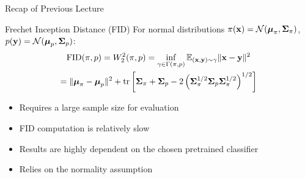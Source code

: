 \documentclass{beamer}
\begin{document}
\begin{frame}
\titlepage
\end{frame}
\begin{frame}{Recap of Previous Lecture}
	\vspace{-0.3cm}
	\begin{block}{Frechet Inception Distance (FID)}
		For normal distributions $\pi(\mathbf{x}) = \mathcal{N}(\boldsymbol{\mu}_\pi, \boldsymbol{\Sigma}_\pi)$, $p(\mathbf{y}) = \mathcal{N}(\boldsymbol{\mu}_p, \boldsymbol{\Sigma}_p)$:
		\vspace{-0.3cm}
		\begin{multline*}
			\mathrm{FID} (\pi, p) =  W_2^2(\pi, p) = \inf_{\gamma \in \Gamma(\pi, p)} \mathbb{E}_{(\mathbf{x}, \mathbf{y}) \sim \gamma} \| \mathbf{x} - \mathbf{y} \|^2 \\
			= \| \boldsymbol{\mu}_{\pi} - \boldsymbol{\mu}_{p}\|^2 + \text{tr} \left[ \boldsymbol{\Sigma}_{\pi} + \boldsymbol{\Sigma}_p - 2 \left(\boldsymbol{\Sigma}_{\pi}^{1/2} \boldsymbol{\Sigma}_p \boldsymbol{\Sigma}_{\pi}^{1/2} \right)^{1/2} \right]
		\end{multline*}
		\vspace{-0.4cm}
	\end{block}
	\begin{itemize}
		\item Requires a large sample size for evaluation
		\item FID computation is relatively slow
		\item Results are highly dependent on the chosen pretrained classifier
		\item Relies on the normality assumption
	\end{itemize}
\end{frame}
\end{document}

